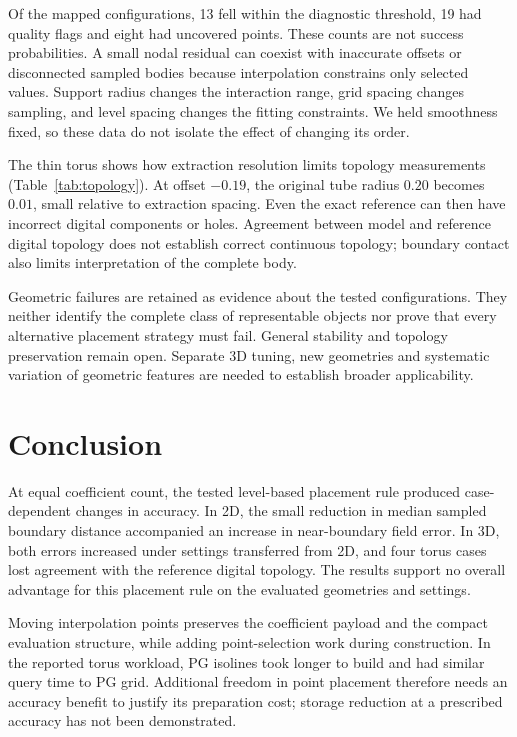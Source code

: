\documentclass[12pt,letterpaper]{article}
\begin{document}
Of the mapped configurations, 13 fell within the diagnostic threshold, 19 had quality flags and eight had uncovered points. These counts are not success probabilities. A small nodal residual can coexist with inaccurate offsets or disconnected sampled bodies because interpolation constrains only selected values. Support radius changes the interaction range, grid spacing changes sampling, and level spacing changes the fitting constraints. We held smoothness fixed, so these data do not isolate the effect of changing its order.

The thin torus shows how extraction resolution limits topology measurements (Table~\ref{tab:topology}). At offset $-0.19$, the original tube radius $0.20$ becomes $0.01$, small relative to extraction spacing. Even the exact reference can then have incorrect digital components or holes. Agreement between model and reference digital topology does not establish correct continuous topology; boundary contact also limits interpretation of the complete body.
\begin{table}[htbp]\centering\small\caption{Thin torus, offset $-0.19$, seed 42, fixed $h=0.4$; PG $n=4$, $\rho=2$, isoline $\Delta/h=0.5$. Resolution varies while fields remain fixed.}\label{tab:topology}\end{table}

Geometric failures are retained as evidence about the tested configurations. They neither identify the complete class of representable objects nor prove that every alternative placement strategy must fail. General stability and topology preservation remain open. Separate 3D tuning, new geometries and systematic variation of geometric features are needed to establish broader applicability.

\section{Conclusion}
At equal coefficient count, the tested level-based placement rule produced case-dependent changes in accuracy. In 2D, the small reduction in median sampled boundary distance accompanied an increase in near-boundary field error. In 3D, both errors increased under settings transferred from 2D, and four torus cases lost agreement with the reference digital topology. The results support no overall advantage for this placement rule on the evaluated geometries and settings.

Moving interpolation points preserves the coefficient payload and the compact evaluation structure, while adding point-selection work during construction. In the reported torus workload, PG isolines took longer to build and had similar query time to PG grid. Additional freedom in point placement therefore needs an accuracy benefit to justify its preparation cost; storage reduction at a prescribed accuracy has not been demonstrated.
\end{document}

